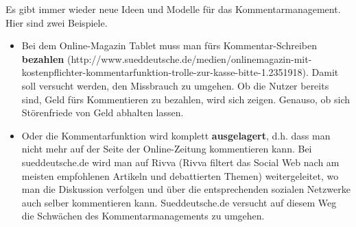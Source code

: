 Es gibt immer wieder neue Ideen und Modelle für das Kommentarmanagement. Hier sind zwei Beispiele.
\begin{itemize}
\item Bei dem Online-Magazin \glqq Tablet\grqq\- muss man fürs Kommentar-Schreiben {\bfseries bezahlen} (http://www.sueddeutsche.de/\-me\-dien/onlinemagazin-mit-kostenpflichter-kommentarfunktion-trolle-zur-kasse-bitte-1.2351918).
Damit soll versucht werden, den Missbrauch zu umgehen. Ob die Nutzer bereits sind, Geld fürs Kommentieren zu bezahlen, wird sich zeigen. Genauso, ob sich Störenfriede von Geld abhalten lassen.


\item Oder die Kommentarfunktion wird komplett {\bfseries ausgelagert}, d.h. dass man nicht mehr auf der Seite der Online-Zeitung kommentieren kann. Bei sueddeutsche.de wird man auf \glqq Rivva\grqq\- (Rivva filtert das Social Web nach am meisten empfohlenen Artikeln und debattierten Themen) weitergeleitet, wo man die Diskussion verfolgen und über die entsprechenden sozialen Netzwerke auch selber kommentieren kann. Sueddeutsche.de versucht auf diesem Weg die Schwächen des Kommentarmanagements zu umgehen. 

\end{itemize}